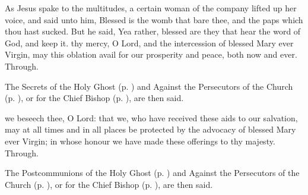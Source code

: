  As Jesus spake to the multitudes, a certain woman of the company lifted up her voice, and said unto him, Blessed is the womb that bare thee, and the paps which thou hast sucked. But he said, Yea rather, blessed are they that hear the word of God, and keep it.
\secret
{} thy mercy, O Lord, and the intercession of blessed Mary ever Virgin, may this oblation avail for our prosperity and peace, both now and ever. Through.
\begin{rubric}
    The Secrets of the Holy Ghost (p. \pageref{SPHolyGhost}) and Against the Persecutors of the Church (p. \pageref{SPAgainst}), or for the Chief Bishop (p. \pageref{SPChiefBishop}), are then said.
\end{rubric}
\postcommunion
{} we beseech thee, O Lord: that we, who have received these aids to our salvation, may at all times and in all places be protected by the advocacy of blessed Mary ever Virgin; in whose honour we have made these offerings to thy majesty. Through.
\begin{rubric}
    The Postcommunions of the Holy Ghost (p. \pageref{SPHolyGhost}) and Against the Persecutors of the Church (p. \pageref{SPAgainst}), or for the Chief Bishop (p. \pageref{SPChiefBishop}), are then said.
\end{rubric}

